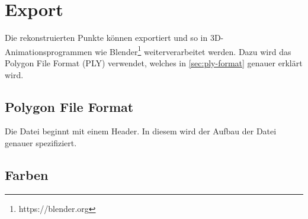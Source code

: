 \section{Export}
Die rekonstruierten Punkte können exportiert und so in 3D-Animationsprogrammen wie Blender\footnote{https://blender.org} weiterverarbeitet werden.
Dazu wird das Polygon File Format (PLY) verwendet, welches in \autoref{sec:ply-format} genauer erklärt wird.

\subsection{Polygon File Format}\label{sec:ply-format}
Die Datei beginnt mit einem Header.
In diesem wird der Aufbau der Datei genauer spezifiziert.



\subsection{Farben}